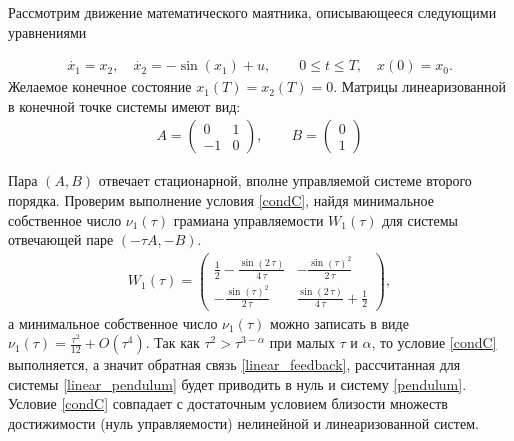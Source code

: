 \documentclass[../main.tex]{subfiles}
\begin{document}
	
	\begin{pr}
	Рассмотрим движение математического маятника, описывающееся следующими уравнениями 
	
	\begin{gather}\label{pendulum}
		\dot{x_1} = x_2, \quad 
		\dot{x_2} = -\sin(x_1) + u, \qquad
		0 \leqslant t \leqslant T, \quad
		x(0) = x_0.
	\end{gather}
	Желаемое конечное состояние $ x_1(T) = x_2(T) =  0 $. Матрицы линеаризованной в конечной точке системы имеют вид:
	\begin{gather}\label{linear_pendulum}
		A = \begin{pmatrix}
			0 & 1\\
			-1 & 0
		\end{pmatrix}, \qquad 
		B = \begin{pmatrix}
			0 \\
			1
		\end{pmatrix}
	\end{gather}
	
	Пара $(A,B)$ отвечает стационарной, вполне управляемой системе второго порядка. Проверим выполнение условия \ref{condC}, найдя минимальное собственное число $ \nu_1(\tau) $ грамиана управляемости $W_1(\tau)$ для системы отвечающей паре $(-\tau A, -B) $. 
	\begin{gather*}
		W_1(\tau) = \begin{pmatrix}  \frac{1}{2}-\frac{\sin\left(2\,\tau \right)}{4\,\tau } & -\frac{{\sin\left(\tau \right)}^2}{2\,\tau }\\ -\frac{{\sin\left(\tau \right)}^2}{2\,\tau } & \frac{\sin\left(2\,\tau \right)}{4\,\tau }+\frac{1}{2} \end{pmatrix},
	\end{gather*}
	а минимальное собственное число $ \nu_1(\tau) $ можно записать в виде $\nu_1(\tau) = \frac{\tau ^2}{12}+O(\tau^4) $. Так как $\tau^2  > \tau^{3-\alpha} $ при малых $\tau$ и $\alpha$, то условие \ref{condC} выполняется, а значит обратная связь \eqref{linear_feedback}, рассчитанная для системы \eqref{linear_pendulum}  будет приводить в нуль и систему \eqref{pendulum}.  Условие \ref{condC} совпадает с достаточным условием близости множеств достижимости (нуль управляемости) нелинейной и линеаризованной систем. 
	

\end{pr}
\end{document}
